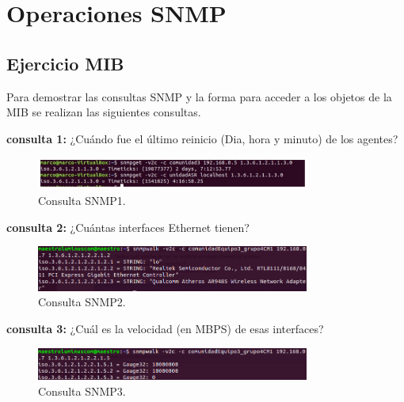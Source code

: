 \section{Operaciones SNMP}

\subsection{Ejercicio MIB}

\noindent
Para demostrar las consultas SNMP y la forma para acceder a los objetos de la MIB se realizan las siguientes consultas.

\noindent
\newline
\textbf{consulta 1:} ¿Cuándo fue el último reinicio (Dia, hora y minuto) de los agentes?

\begin{figure}[htbp!]
	\centering
		\includegraphics[width=0.8\textwidth]{images/capturas/pregunta1}
	\caption{Consulta SNMP1.}
\end{figure}

\textbf{consulta 2:} ¿Cuántas interfaces Ethernet tienen?

\begin{figure}[htbp!]
	\centering
		\includegraphics[width=0.8\textwidth]{images/capturas/pregunta2}
	\caption{Consulta SNMP2.}
\end{figure}

\textbf{consulta 3:} ¿Cuál es la velocidad (en MBPS) de esas interfaces?
\begin{figure}[htbp!]
	\centering
		\includegraphics[width=0.8\textwidth]{images/capturas/pregunta3}
	\caption{Consulta SNMP3.}
\end{figure}


